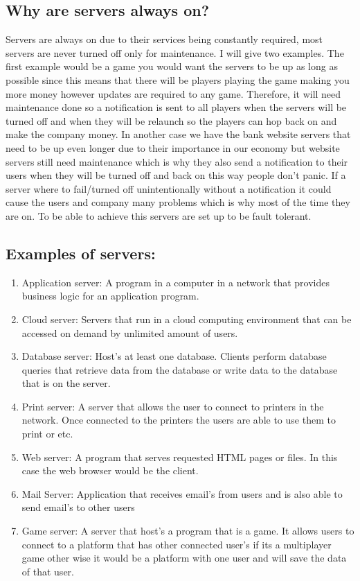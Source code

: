 \documentclass[conference]{IEEEtran}
\begin{document}
\subsection*{Why are servers always on?}
Servers are always on due to their services being constantly required, most servers are never turned off only for maintenance. I will give two examples.  The first example would be a game you would want the servers to be up as long as possible since this means that there will be players playing the game making you more money however updates are required to any game. Therefore, it will need maintenance done so a notification is sent to all players when the servers will be turned off and when they will be relaunch so the players can hop back on and make the company money. In another case we have the bank website servers that need to be up even longer due to their importance in our economy but website servers still need maintenance which is why they also send a notification to their users when they will be turned off and back on this way people don’t panic. If a server where to fail/turned off unintentionally without a notification it could cause the users and company many problems which is why most of the time they are on. To be able to achieve this servers are set up to be fault tolerant.
\linebreak
\subsection*{Examples of servers:}
\begin{enumerate}
	\item Application server: A program in a computer in a network that provides business logic for an application program.
	\item Cloud server: Servers that run in a cloud computing environment that can be accessed on demand by unlimited amount of users.
	\item Database server: Host’s at least one database. Clients perform database queries that retrieve data from the database or write data to the database that is on the server.
	\item Print server: A server that allows the user to connect to printers in the network. Once connected to the printers the users are able to use them to print or etc.
	\item Web server: A program that serves requested HTML pages or files. In this case the web browser would be the client.
	\item Mail Server: Application that receives email’s from users and is also able to send email’s to other users
	\item Game server: A server that host’s a program that is a game. It allows users to connect to a platform that has other connected user’s if its a multiplayer game other wise it would be a platform with one user and will save the data of that user.
\end{enumerate}
\end{document}

